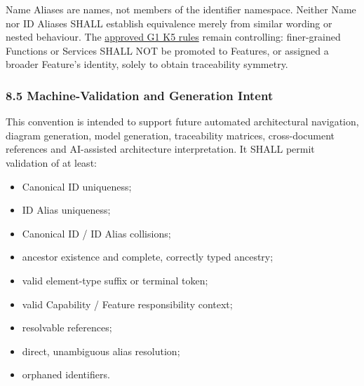 \label{rad:metamodel:417}

Name Aliases are names, not members of the identifier namespace. Neither Name nor ID Aliases SHALL establish equivalence merely from similar wording or nested behaviour. The \href{https://github.com/fhirfactory/harmonia/blob/98410db60155198a75f74c79d98060070209faa1/docs/markdown/04-information-architecture/reviews/package2-g1-review.md\#65-metamodel-guardrail}{approved G1 K5 rules} remain controlling: finer-grained Functions or Services SHALL NOT be promoted to Features, or assigned a broader Feature's identity, solely to obtain traceability symmetry.

\label{rad:metamodel:419}
\subsubsection*{8.5 Machine-Validation and Generation Intent}
\label{rad:metamodel:421}

This convention is intended to support future automated architectural navigation, diagram generation, model generation, traceability matrices, cross-document references and AI-assisted architecture interpretation. It SHALL permit validation of at least:

\label{rad:metamodel:423}

\begin{itemize}

\item
Canonical ID uniqueness;



\item
ID Alias uniqueness;



\item
Canonical ID /\allowbreak{} ID Alias collisions;



\item
ancestor existence and complete, correctly typed ancestry;



\item
valid element-type suffix or terminal token;



\item
valid Capability /\allowbreak{} Feature responsibility context;



\item
resolvable references;



\item
direct, unambiguous alias resolution;



\item
orphaned identifiers.



\end{itemize}
\label{rad:metamodel:433}

